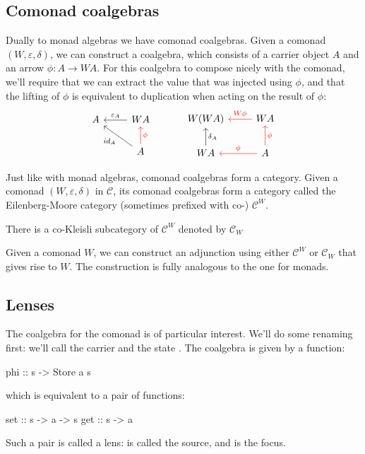 \documentclass[DaoFP]{subfiles}
\begin{document}
\subsection{Comonad coalgebras}

Dually to monad algebras we have comonad coalgebras. Given a comonad $(W, \varepsilon, \delta)$, we can construct a coalgebra, which consists of a carrier object $A$ and an arrow $\phi \colon A \to W A$. For this coalgebra to compose nicely with the comonad, we'll require that we can extract the value that was injected using $\phi$, and that the lifting of $\phi$ is equivalent to duplication when acting on the result of $\phi$:
\[
 \begin{tikzcd}
 A
 & W A
 \arrow[l, "\varepsilon_A"']
 \\
 & A
 \arrow[ul, "id_A"]
\arrow[u, red, "\phi"']
 \end{tikzcd}
  \hspace{30pt}
 \begin{tikzcd}
W(W A) 
&WA
\arrow[l, red, "W \phi "']
\\
W A
\arrow[u, "\delta_A"']
& A
\arrow[l, red, "\phi"']
\arrow[u, red, "\phi"']
 \end{tikzcd}
\]

Just like with monad algebras, comonad coalgebras form a category. Given a comonad $(W, \varepsilon, \delta)$ in $\mathcal{C}$, its comonad coalgebras form a category called the Eilenberg-Moore category (sometimes prefixed with co-) $\mathcal{C}^W$.

There is a co-Kleisli subcategory of $\mathcal{C}^W$ denoted by $\mathcal{C}_W$

Given a comonad $W$, we can construct an adjunction using either $\mathcal{C}^W$ or $\mathcal{C}_W$ that gives rise to $W$. The construction is fully analogous to the one for monads.

\subsection{Lenses}

The coalgebra for the  comonad is of particular interest. We'll do some renaming first: we'll call the carrier  and the state . The coalgebra is given by a function:
\begin{haskell}
phi :: s -> Store a s
\end{haskell}
which is equivalent to a pair of functions:
\begin{haskell}
set :: s -> a -> s
get :: s -> a
\end{haskell}
Such a pair is called a lens:  is called the source, and  is the focus. 
\end{document}
